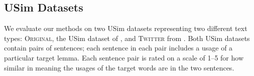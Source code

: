 \documentclass[11pt]{article}
\newcommand\original{\textsc{Original}\xspace}
\newcommand\twitter{\textsc{Twitter}\xspace}
\begin{document}

\subsection{USim Datasets \label{sec:datasets}}


We evaluate our methods on two USim datasets representing two
different text types: \original, the USim dataset of \cite{Erk2009b},
and \twitter from \cite{Gella+:2013}. Both USim datasets contain pairs
of sentences; each sentence in each pair includes a usage of a
particular target lemma. Each sentence pair is rated on a scale of
1--5 for how similar in meaning the usages of the target words are in
the two sentences.
\end{document}
